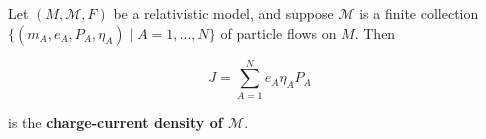 Let $(M, \mathcal{M}, F)$ be a relativistic model, and suppose $\mathcal{M}$ is a finite collection $\{(m_A, e_A, P_A, \eta_A) \mid A = 1, \ldots, N\}$ of particle flows on $M$. Then

$$J = \sum_{A=1}^{N} e_A \eta_A P_A$$

is the \textbf{charge-current density of $\mathcal{M}$}.
